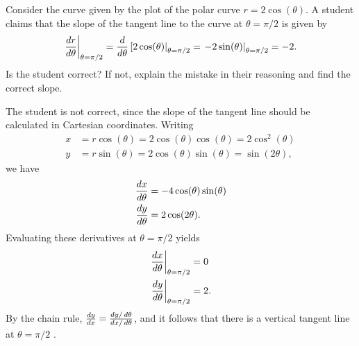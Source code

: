 \documentclass[noauthor]{ximera}
\begin{document}
\begin{problem}
Consider the curve given by the plot of the polar curve $r = 2 \cos(\theta)$. A student claims that the slope of the tangent line to the curve at $\theta = \pi/2$ is given by
$$
\left.\frac{\mathop{}\!d r}{\mathop{}\!d \theta}\right|_{\theta = \pi/2} =  \frac{\mathop{}\!d}{\mathop{}\!d \theta }  \left[2 \cos(\theta) \right|_{\theta = \pi/2}=  \left. -2 \sin(\theta) \right|_{\theta = \pi/2} = -2.
$$
Is the student correct? If not, explain the mistake in their reasoning and find the correct slope.
\begin{freeResponse}
The student is not correct, since the slope of the tangent line should be calculated in Cartesian coordinates. Writing
\begin{align*}
x &= r \cos(\theta) = 2 \cos(\theta) \cos(\theta) = 2 \cos^2(\theta) \\
y &= r \sin(\theta) = 2 \cos(\theta) \sin(\theta) =  \sin(2 \theta),
\end{align*}
we have
\begin{align*}
\frac{\mathop{}\!d x}{\mathop{}\!d \theta} &= -4 \cos (\theta)\sin(\theta) \\
\frac{\mathop{}\!d y}{\mathop{}\!d \theta} &= 2 \cos(2\theta).
\end{align*}
Evaluating these derivatives at $\theta = \pi/2$ yields
\begin{align*}
\left.\frac{\mathop{}\!d x}{\mathop{}\!d \theta}\right|_{\theta = \pi/2} &= 0 \\
\left.\frac{\mathop{}\!d y}{\mathop{}\!d \theta}\right|_{\theta = \pi/2} &= 2.
\end{align*}
By the chain rule, $\frac{\mathop{}\!d y}{\mathop{}\!d x} = \frac{\mathop{}\!d y/ \mathop{}\!d \theta}{\mathop{}\!d x/ \mathop{}\!d \theta}$, and it follows that there is a vertical tangent line at $\theta = \pi/2$ . 
\end{freeResponse}
\end{problem}
\end{document}
